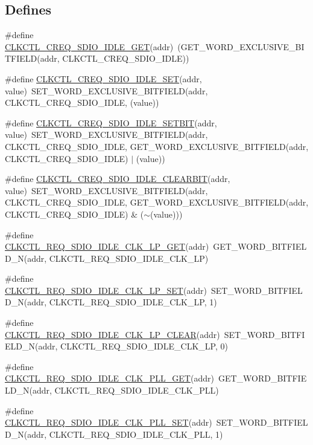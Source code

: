 \subsection*{Defines}
\begin{DoxyCompactItemize}
\item 
\#define \hyperlink{a00544_a54f05a5a4cc312b4ea06bdae65cc75d8}{CLKCTL\_\-CREQ\_\-SDIO\_\-IDLE\_\-GET}(addr)~(GET\_\-WORD\_\-EXCLUSIVE\_\-BITFIELD(addr, CLKCTL\_\-CREQ\_\-SDIO\_\-IDLE))
\item 
\#define \hyperlink{a00544_ab54d0b51787faac19ad1438ef86dab0f}{CLKCTL\_\-CREQ\_\-SDIO\_\-IDLE\_\-SET}(addr, value)~SET\_\-WORD\_\-EXCLUSIVE\_\-BITFIELD(addr, CLKCTL\_\-CREQ\_\-SDIO\_\-IDLE, (value))
\item 
\#define \hyperlink{a00544_a620d4c3140a18bc4ca571aa5240590fa}{CLKCTL\_\-CREQ\_\-SDIO\_\-IDLE\_\-SETBIT}(addr, value)~SET\_\-WORD\_\-EXCLUSIVE\_\-BITFIELD(addr, CLKCTL\_\-CREQ\_\-SDIO\_\-IDLE, GET\_\-WORD\_\-EXCLUSIVE\_\-BITFIELD(addr, CLKCTL\_\-CREQ\_\-SDIO\_\-IDLE) $|$ (value))
\item 
\#define \hyperlink{a00544_a475fe3460aa7649f24e27a206ac3b839}{CLKCTL\_\-CREQ\_\-SDIO\_\-IDLE\_\-CLEARBIT}(addr, value)~SET\_\-WORD\_\-EXCLUSIVE\_\-BITFIELD(addr, CLKCTL\_\-CREQ\_\-SDIO\_\-IDLE, GET\_\-WORD\_\-EXCLUSIVE\_\-BITFIELD(addr, CLKCTL\_\-CREQ\_\-SDIO\_\-IDLE) \& ($\sim$(value)))
\item 
\#define \hyperlink{a00544_ab34f27ef22eec0811abcfc978ad31e39}{CLKCTL\_\-REQ\_\-SDIO\_\-IDLE\_\-CLK\_\-LP\_\-GET}(addr)~GET\_\-WORD\_\-BITFIELD\_\-N(addr, CLKCTL\_\-REQ\_\-SDIO\_\-IDLE\_\-CLK\_\-LP)
\item 
\#define \hyperlink{a00544_a58f42d3ebb8568dc46fb880040eeee7c}{CLKCTL\_\-REQ\_\-SDIO\_\-IDLE\_\-CLK\_\-LP\_\-SET}(addr)~SET\_\-WORD\_\-BITFIELD\_\-N(addr, CLKCTL\_\-REQ\_\-SDIO\_\-IDLE\_\-CLK\_\-LP, 1)
\item 
\#define \hyperlink{a00544_a7e87d71e8c1f71a9c2712254c50a98bb}{CLKCTL\_\-REQ\_\-SDIO\_\-IDLE\_\-CLK\_\-LP\_\-CLEAR}(addr)~SET\_\-WORD\_\-BITFIELD\_\-N(addr, CLKCTL\_\-REQ\_\-SDIO\_\-IDLE\_\-CLK\_\-LP, 0)
\item 
\#define \hyperlink{a00544_a2c12476eecc3bf3aad3888ca2aebe515}{CLKCTL\_\-REQ\_\-SDIO\_\-IDLE\_\-CLK\_\-PLL\_\-GET}(addr)~GET\_\-WORD\_\-BITFIELD\_\-N(addr, CLKCTL\_\-REQ\_\-SDIO\_\-IDLE\_\-CLK\_\-PLL)
\item 
\#define \hyperlink{a00544_adad154c1a05d413e239f397bc64cf1ea}{CLKCTL\_\-REQ\_\-SDIO\_\-IDLE\_\-CLK\_\-PLL\_\-SET}(addr)~SET\_\-WORD\_\-BITFIELD\_\-N(addr, CLKCTL\_\-REQ\_\-SDIO\_\-IDLE\_\-CLK\_\-PLL, 1)

\end{DoxyCompactItemize}
